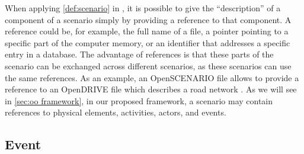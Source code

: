 


\cstartc When applying \cref{def:scenario} in , it is possible 
to give the ``description'' of a component of a scenario simply by providing a reference to that component. \cendc
A reference could be, for example, the full name of a file, a pointer pointing to a specific part of the computer memory, or an identifier that addresses a specific entry in a database.
The advantage of references is that these parts of the scenario can be exchanged across different scenarios, as these scenarios can use the same references. 
As an example, an OpenSCENARIO file allows to provide a reference to an OpenDRIVE file which describes a road network \autocite{dupuis2010opendrive}. As we will see in \cref{sec:oo framework}, in our proposed \cstartb framework\cendb, a scenario may contain references to \cstartc physical elements\cendc, activities, actors, and events.
 


\subsection{Event}
\label{sec:event}

